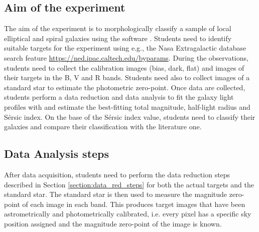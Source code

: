 \documentclass[a4paper, 11pt, fleqn]{memoir}
\begin{document}
\subsection{Aim of the experiment}

The aim of the experiment is to morphologically classify a sample of local elliptical and spiral galaxies using the software .
Students need to identify suitable targets for the experiment using e.g., the Nasa Extragalactic database search feature \url{https://ned.ipac.caltech.edu/byparams}.
During the observations, students need to collect the calibration images (bias, dark, flat) and images of their targets in the B, V and R bands.
Students need also to collect images of a standard star to estimate the photometric zero-point.
Once data are collected, students perform a data reduction and data analysis to fit the galaxy light profiles with  and estimate the best-fitting total magnitude, half-light radius and Sérsic index.
On the base of the Sérsic index value, students need to classify their galaxies and compare their classification with the literature one.

\subsection{Data Analysis steps}

After data acquisition, students need to perform the data reduction steps described in Section \ref{section:data_red_steps} for both the actual targets and the standard star.
The standard star is then used to measure the magnitude zero-point of each image in each band.
This produces target images that have been astrometrically and photometrically calibrated, i.e. every pixel has a specific sky position assigned and the magnitude zero-point of the image is known.
\end{document}
